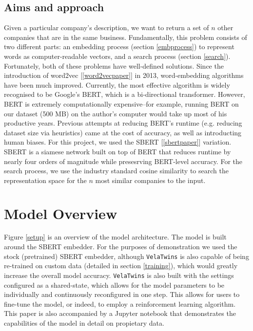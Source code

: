 \documentclass[a4paper]{article}
\begin{document}
\subsection{Aims and approach}

Given a particular company's description, we want to return a set of $n$ other
companies that are in the same business. Fundamentally, this problem consists of
two different parts: an embedding process (section \ref{embprocess}) to
represent words as computer-readable vectors, and a search process (section
\ref{search}). Fortunately, both of these problems have well-defined solutions.
Since the introduction of word2vec [\ref{word2vecpaper}] in 2013, word-embedding
algorithms have been much improved. Currently, the most effective algorithm is
widely recognised to be Google's BERT, which is a bi-directional transformer.
However, BERT is extremely computationally expensive--for example, running BERT
on our dataset (500 MB) on the author's computer would take up most of his
productive years. Previous attempts at reducing BERT's runtime (e.g. reducing
dataset size via heuristics) came at the cost of accuracy, as well as
introducting human biases. For this project, we used the SBERT
[\ref{sbertpaper}] variation. SBERT is a siamese network built on top of BERT
that reduces runtime by nearly four orders of magnitude while presesrving
BERT-level accuracy. For the search process, we use the industry standard cosine
similarity to search the representation space for the $n$ most similar companies
to the input. 


\section{Model Overview}
Figure \ref{setup} is an overview of the model architecture. The model is built
around the SBERT embedder. For the purposes of demonstration we used the stock
(pretrained) SBERT embedder, although \lstinline{VelaTwins} is also capable of
being re-trained on custom data (detailed in section \ref{training}), which
would greatly increase the overall model accuracy. \lstinline{VelaTwins} is also
built with the settings configured as a shared-state, which allows for the model
parameters to be individually and continuously reconfigured in one step. This
allows for users to fine-tune the model, or indeed, to employ a reinforcement
learning algorithm. This paper is also accompanied by a Jupyter notebook that
demonstrates the capabilities of the model in detail on propietary data.
\end{document}
